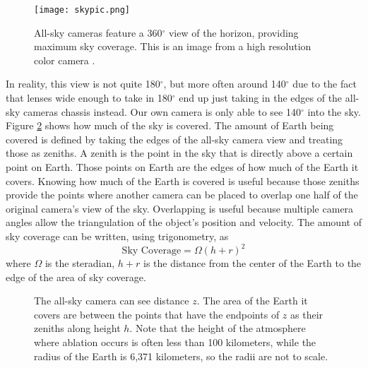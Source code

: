\begin{figure}[ht!]
  \centering
  \texttt{[image: skypic.png]}
  \caption{All-sky cameras feature a 360$^{\circ}$ view of the horizon, providing maximum sky coverage. This is an image from a high resolution color camera \protect\cite{Alcor}.}
  \label{fig:skypic}
\end{figure}

In reality, this view is not quite 180$^{\circ}$, but more often around 140$^{\circ}$ due to the fact that lenses wide enough to take in 180$^{\circ}$ end up just taking in the edges of the all-sky cameras chassis instead. Our own camera is only able to see 140$^{\circ}$ into the sky. Figure \ref{fig:atmosphere} shows how much of the sky is covered. The amount of Earth being covered is defined by taking the edges of the all-sky camera view and treating those as zeniths. A zenith is the point in the sky that is directly above a certain point on Earth. Those points on Earth are the edges of how much of the Earth it covers. Knowing how much of the Earth is covered is useful because those zeniths provide the points where another camera can be placed to overlap one half of the original camera's view of the sky. Overlapping is useful because multiple camera angles allow the triangulation of the object's position and velocity. The amount of sky coverage can be written, using trigonometry, as
\begin{equation} \label{eq:coverage}
	\textrm{Sky Coverage} = \Omega(h+r)^2
\end{equation}
where $\Omega$ is the steradian, $h+r$ is the distance from the center of the Earth to the edge of the area of sky coverage.

\begin{figure}[ht!]
	\centering
	\caption{The all-sky camera can see distance $z$. The area of the Earth it covers are between the points that have the endpoints of $z$ as their zeniths along height $h$. Note that the height of the atmosphere where ablation occurs is often less than 100 kilometers, while the radius of the Earth is 6,371 kilometers, so the radii are not to scale.}
	\label{fig:atmosphere}
\end{figure}

